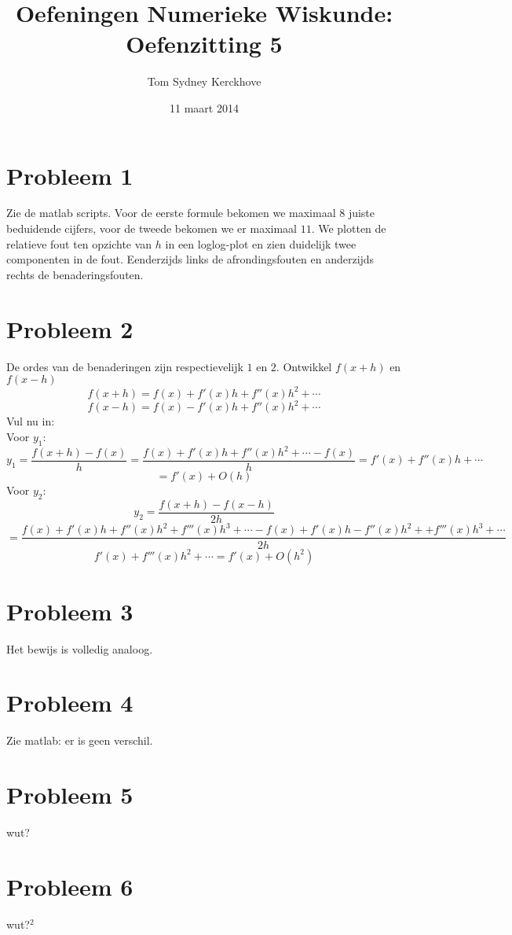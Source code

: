 \documentclass[12pt,a4paper]{article}
\author{Tom Sydney Kerckhove}
\title{Oefeningen Numerieke Wiskunde:\\ Oefenzitting 5}
\date{11 maart 2014}
\begin{document}
\maketitle

\section{Probleem 1}
Zie de matlab scripts.
Voor de eerste formule bekomen we maximaal $8$ juiste beduidende cijfers, voor de tweede bekomen we er maximaal $11$. We plotten de relatieve fout ten opzichte van $h$ in een loglog-plot en zien duidelijk twee componenten in de fout. Eenderzijds links de afrondingsfouten en anderzijds rechts de benaderingsfouten.

\section{Probleem 2}
De ordes van de benaderingen zijn respectievelijk $1$ en $2$.
Ontwikkel $f(x+h)$ en $f(x-h)$
\[
f(x+h) = f(x) + f'(x)h + f''(x)h^2 + \cdots
\]
\[
f(x-h) = f(x) - f'(x)h + f''(x)h^2 + \cdots
\]
Vul nu in:\\
Voor $y_1$:
\[
y_1 = \frac{f(x+h) - f(x)}{h} = \frac{f(x) + f'(x)h + f''(x)h^2 + \cdots - f(x)}{h} = f'(x) + f''(x)h + \cdots
\]
\[
= f'(x) + O(h) 
\]
Voor $y_2$:
\[
y_2 = \frac{f(x+h) - f(x-h)}{2h} 
\]
\[= \frac{f(x) + f'(x)h + f''(x)h^2 + f'''(x)h^3 + \cdots - f(x) + f'(x)h - f''(x)h^2 + + f'''(x)h^3 + \cdots }{2h}
\]
\[
f'(x) + f'''(x)h^2 + \cdots = f'(x) + O(h^2)
\]


\section{Probleem 3}
Het bewijs is volledig analoog.

\section{Probleem 4}
Zie matlab: er is geen verschil.

\section{Probleem 5}
wut?
\section{Probleem 6}
wut?$^2$
\listoftodos
\end{document}
